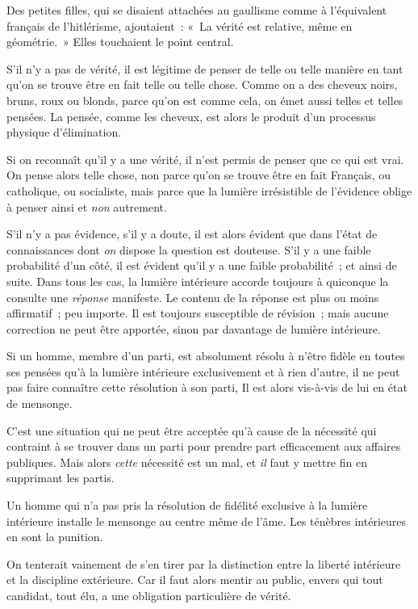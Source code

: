 \documentclass[french,twoside]{book} %
\begin{document}
Des petites filles, qui se disaient attachées au gaullisme comme à l’équivalent français de l’hitlérisme, ajoutaient : « La vérité est relative, même en géométrie. » Elles touchaient le point central.\par
S’il n’y a pas de vérité, il est légitime de penser de telle ou telle manière en tant qu’on se trouve être en fait telle ou telle chose. Comme on a des cheveux noirs, bruns, roux ou blonds, parce qu’on est comme cela, on émet aussi telles et telles pensées. La pensée, comme les cheveux, est alors le produit d’un processus physique d’élimination.\par
Si on reconnaît qu’il y a une vérité, il n’est permis de penser que ce qui est vrai. On pense alors telle chose, non parce qu’on se trouve être en fait Français, ou catholique, ou socialiste, mais parce que la lumière irrésistible de l’évidence oblige à penser ainsi et \emph{non} autrement.\par
S’il n’y a pas évidence, s’il y a doute, il est alors évident que dans l’état de connaissances dont \emph{on} dispose la question est douteuse. S’il y a une faible probabilité d’un côté, il est évident qu’il y a une faible probabilité ; et ainsi de suite. Dans tous les cas, la lumière intérieure accorde toujours à quiconque la consulte une \emph{réponse} manifeste. Le contenu de la réponse est plus ou moins affirmatif ; peu importe. Il est toujours susceptible de révision ; mais aucune correction ne peut être apportée, sinon par davantage de lumière intérieure.\par
Si un homme, membre d’un parti, est absolument résolu à n’être fidèle en toutes ses pensées qu’à la lumière intérieure exclusivement et à rien d’autre, il ne peut pas faire connaître cette résolution à son parti, Il est alors vis-à-vis de lui en état de mensonge.\par
C’est une situation qui ne peut être acceptée qu’à cause de la nécessité qui contraint à se trouver dans un parti pour prendre part efficacement aux affaires publiques. Mais alors \emph{cette} nécessité est un mal, et \emph{il} faut y mettre fin en supprimant les partis.\par
Un homme qui n’a pas pris la résolution de fidélité exclusive à la lumière intérieure installe le mensonge au centre même de l’âme. Les ténèbres intérieures en sont la punition.\par
On tenterait vainement de s’en tirer par la distinction entre la liberté intérieure et la discipline extérieure. Car il faut alors mentir au public, envers qui tout candidat, tout élu, a une obligation particulière de vérité.\par
\end{document}
